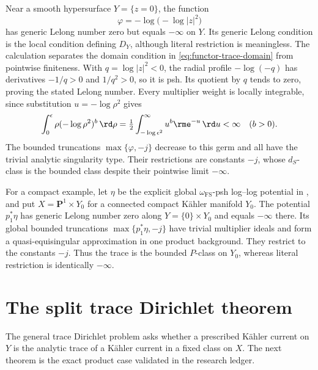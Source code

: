 \begin{example}
\label{ex:functor-zero-lelong-pole}
Near a smooth hypersurface $Y=\{z=0\}$, the function
\[
                  \varphi=-\log\bigl(-\log|z|^2\bigr)
\]
has generic Lelong number zero but equals $-\infty$ on $Y$. Its generic Lelong condition is the local condition defining
$D_Y$, although literal restriction is meaningless. The
calculation separates the domain condition in
\eqref{eq:functor-trace-domain} from pointwise finiteness. With
$q=\log|z|^2<0$, the radial profile $-\log(-q)$ has derivatives
$-1/q>0$ and $1/q^2>0$, so it is psh. Its quotient by $q$ tends to zero,
proving the stated Lelong number. Every multiplier weight is locally
integrable, since substitution $u=-\log\rho^2$ gives
\[
 \int_0^\epsilon \rho(-\log\rho^2)^b\,\rd\rho
   =\tfrac12\int_{-\log\epsilon^2}^{\infty}u^b\rme^{-u}\,\rd u<\infty
 \quad(b>0).
\]
The bounded truncations $\max\{\varphi,-j\}$ decrease to this germ and
all have the trivial analytic singularity type. Their restrictions are
constants $-j$, whose $d_S$-class is the bounded class despite their
pointwise limit $-\infty$.

For a compact example, let $\eta$ be the explicit global
$\omega_{\mathrm{FS}}$-psh log--log potential in
, and put $X=\mathbf P^1\times Y_0$
for a connected compact K\"ahler manifold $Y_0$. The potential
$p_1^*\eta$ has generic Lelong number zero along
$Y=\{0\}\times Y_0$ and equals $-\infty$ there. Its global bounded
truncations $\max\{p_1^*\eta,-j\}$ have trivial multiplier ideals and
form a quasi-equisingular approximation in one product background.
They restrict to the constants $-j$. Thus the trace is the bounded
$P$-class on $Y_0$, whereas literal restriction is identically
$-\infty$.
\end{example}

\section{The split trace Dirichlet theorem}
\label{sec:functor-split-dirichlet}

The general trace Dirichlet problem asks whether a prescribed K\"ahler
current on $Y$ is the analytic trace of a K\"ahler current in a fixed
class on $X$. The next theorem is the exact product case validated
in the research ledger.


